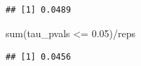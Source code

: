 \documentclass[12pt]{article}
\newenvironment{Shaded}{\begin{snugshade}}{\end{snugshade}}
\newcommand{\FloatTok}[1]{\textcolor[rgb]{0.00,0.00,0.81}{#1}}
\newcommand{\FunctionTok}[1]{\textcolor[rgb]{0.00,0.00,0.00}{#1}}
\newcommand{\NormalTok}[1]{#1}
\newcommand{\SpecialCharTok}[1]{\textcolor[rgb]{0.00,0.00,0.00}{#1}}
\begin{document}
\begin{verbatim}
## [1] 0.0489
\end{verbatim}

\begin{Shaded}
\begin{Highlighting}[]
\FunctionTok{sum}\NormalTok{(tau\_pvals }\SpecialCharTok{\textless{}=} \FloatTok{0.05}\NormalTok{)}\SpecialCharTok{/}\NormalTok{reps}
\end{Highlighting}
\end{Shaded}

\begin{verbatim}
## [1] 0.0456
\end{verbatim}



\end{document}
